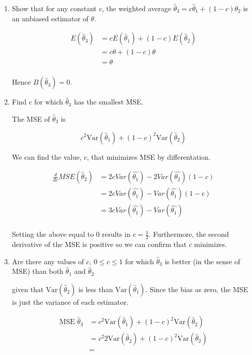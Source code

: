 \documentclass{tufte-book}
\newcommand{\Var}{\mathrm{Var}}
\theoremstyle{mytheoremstyle}
\theoremstyle{mylemstyle}
\theoremstyle{mydefstyle}
\begin{document}
\begin{enumerate}

\item Show that for any constant $c$, the weighted average $\hat{\theta}_3 = c\hat{\theta}_1 + (1-c)\hat{\theta}_2$ is an unbiased estimator of $\theta$.

\begin{align*}
E(\hat{\theta}_3) &= cE(\hat{\theta}_1) + (1-c)E(\hat{\theta}_2)\\
&= c\theta + (1-c)\theta\\
&= \theta\\
\end{align*}

Hence $B(\hat{\theta}_3) = 0$.

\item Find $c$ for which $\hat{\theta}_3$ has the smallest MSE.

The MSE of $\hat{\theta}_3$ is

\[ c^2\Var(\hat{\theta}_1) + (1-c)^2\Var(\hat{\theta}_2) \]

We can find the value, $c$, that minimizes MSE by differentation.

\begin{align*}
\frac{d}{dc} MSE(\hat{\theta}_2) &= 2cVar(\hat{\theta_1}) - 2Var(\hat{\theta_2})(1-c)\\
&= 2cVar(\hat{\theta_1}) - Var(\hat{\theta_1})(1-c)\\
&= 3cVar(\hat{\theta_1}) - Var(\hat{\theta_1})\\
\end{align*}

Setting the above equal to $0$ results in $c=\frac{1}{3}$.  Furthermore, the second derivative of the MSE is positive so we can confirm that $c$ minimizes.

\item Are there any values of $c$, $0 \leq c \leq 1$ for which $\hat{\theta}_3$ is better (in the sense of MSE) than both $\hat{\theta}_1$ and $\hat{\theta}_2$

 given that $\Var(\hat{\theta}_2)$ is less than $\Var(\hat{\theta}_1)$.  Since the bias as zero, the MSE is just the variance of each estimator.

\begin{align*}
\text{MSE }\hat{\theta}_3 &= c^2\Var(\hat{\theta}_1) + (1-c)^2\Var(\hat{\theta}_2)\\
&= c^2 2\Var(\hat{\theta}_2) + (1-c)^2\Var(\hat{\theta}_2)\\
&=
\end{align*}

\end{enumerate}
\end{document}
